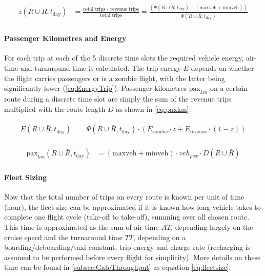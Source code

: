 \begin{align} \label{eq:zombierat}
\begin{split}
    z(R\cup\bar{R}, t_{\text{day}}) &= \frac{\text{total trips - revenue trips}}{\text{total trips}} = \frac{(\Psi(R\cup\bar{R}, t_{\text{day}}) - (\text{maxveh} + \text{minveh}))}{\Psi(R\cup\bar{R}, t_{\text{day}})}
\end{split}
\end{align}


\paragraph{Passenger Kilometres and Energy}

For each trip at each of the 5 discrete time slots the required vehicle energy, air-time and turnaround time is calculated. The trip energy $E$ depends on whether the flight carries passengers or is a zombie flight, with the latter being significantly lower (\autoref{eq:EnergyTrip}). Passenger kilometres $\text{pax}_{km}$ on a certain route during a discrete time slot are simply the sum of the revenue trips multiplied with the route length $D$ as shown in \autoref{eq:paxkm}.

\begin{align} \label{eq:EnergyTrip}
\begin{split}
    E(R\cup\bar{R}, t_{\text{day}}) &= \Psi(R\cup\bar{R}, t_{\text{day}}) \cdot \left(E_{\text{zombie}} \cdot z + E_{\text{revenue}} \cdot (1-z) \right)
\end{split}
\end{align}

\begin{align} \label{eq:paxkm}
\begin{split}
    \text{pax}_{km}(R\cup\bar{R}, t_{\text{day}}) &= \left( \text{maxveh} + \text{minveh} \right) \cdot veh_{pax} \cdot D(R\cup\bar{R})
\end{split}
\end{align}


\paragraph{Fleet Sizing}

Now that the total number of trips on every route is known per unit of time (hour), the fleet size can be approximated if it is known how long vehicle takes to complete one flight cycle (take-off to take-off), summing over all chosen route. This time is approximated as the sum of air time $AT$, depending largely on the cruise speed and the turnaround time $TT$, depending on a boarding/deboarding/taxi constant, trip energy and charge rate (recharging is assumed to be performed before every flight for simplicity). More details on these time can be found in \autoref{subsec:GateThroughput} as equation \autoref{eq:fleetsize}.


